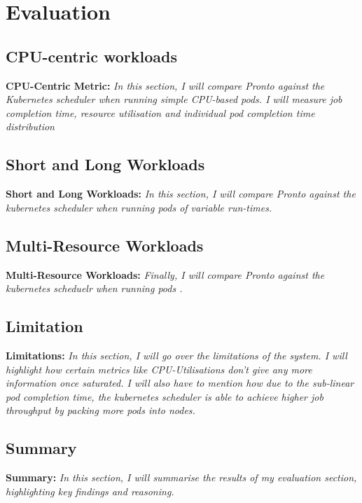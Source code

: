 \chapter{Evaluation}
%

\section{CPU-centric workloads}
\begin{tcolorbox}[boxsep=0mm,left=2.5mm,right=2.5mm]
    \textbf{CPU-Centric Metric:} {\em In this section, I will compare Pronto
    against the Kubernetes scheduler when running simple CPU-based pods. I
    will measure job completion time, resource utilisation and individual pod
    completion time distribution
    }
\end{tcolorbox}


\section{Short and Long Workloads}
\begin{tcolorbox}[boxsep=0mm,left=2.5mm,right=2.5mm]
    \textbf{Short and Long Workloads:} {\em In this section, I will compare
    Pronto against the kubernetes scheduler when running pods of variable
    run-times.
    }
\end{tcolorbox}

\section{Multi-Resource Workloads}
\begin{tcolorbox}[boxsep=0mm,left=2.5mm,right=2.5mm]
    \textbf{Multi-Resource Workloads:} {\em Finally, I will compare Pronto
    against the kubernetes scheduelr when running pods .
    }
\end{tcolorbox}

\section{Limitation}
\begin{tcolorbox}[boxsep=0mm,left=2.5mm,right=2.5mm]
    \textbf{Limitations:} {\em In this section, I will go over the limitations
    of the system. I will highlight how certain metrics like CPU-Utilisations
    don't give any more information once saturated. I will also have to mention
    how due to the sub-linear pod completion time, the kubernetes scheduler is
    able to achieve higher job throughput by packing more pods into nodes.
    }
\end{tcolorbox}

\section{Summary}
\begin{tcolorbox}[boxsep=0mm,left=2.5mm,right=2.5mm]
    \textbf{Summary:} {\em In this section, I will summarise the results of my
    evaluation section, highlighting key findings and reasoning.
    }
\end{tcolorbox}
